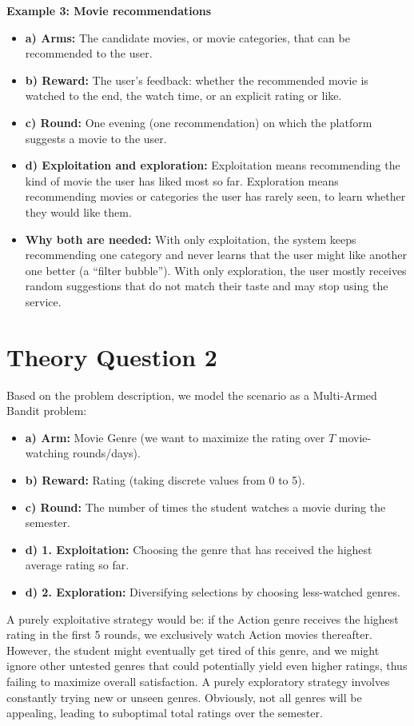 \documentclass[12pt,a4paper]{article}
\begin{document}
\textbf{Example 3: Movie recommendations}
\begin{itemize}
    \item \textbf{a) Arms:} The candidate movies, or movie categories, that can be recommended to the user.
%
    \item \textbf{b) Reward:} The user's feedback: whether the recommended movie is watched to the end, the watch time, or an explicit rating or like.
%
    \item \textbf{c) Round:} One evening (one recommendation) on which the platform suggests a movie to the user.
%
    \item \textbf{d) Exploitation and exploration:} Exploitation means recommending the kind of movie the user has liked most so far.
Exploration means recommending movies or categories the user has rarely seen, to learn whether they would like them.
%
    \item \textbf{Why both are needed:} With only exploitation, the system keeps recommending one category and never learns that the user might like another one better (a ``filter bubble'').
With only exploration, the user mostly receives random suggestions that do not match their taste and may stop using the service.
%
\end{itemize}

\section*{Theory Question 2} %
Based on the problem description, we model the scenario as a Multi-Armed Bandit problem: %
\begin{itemize}
    \item \textbf{a) Arm:} Movie Genre (we want to maximize the rating over $T$ movie-watching rounds/days).
%
    \item \textbf{b) Reward:} Rating (taking discrete values from 0 to 5).
%
    \item \textbf{c) Round:} The number of times the student watches a movie during the semester.
%
    \item \textbf{d) 1. Exploitation:} Choosing the genre that has received the highest average rating so far.
%
    \item \textbf{d) 2. Exploration:} Diversifying selections by choosing less-watched genres.
%
\end{itemize}

A purely exploitative strategy would be: if the Action genre receives the highest rating in the first 5 rounds, we exclusively watch Action movies thereafter.
However, the student might eventually get tired of this genre, and we might ignore other untested genres that could potentially yield even higher ratings, thus failing to maximize overall satisfaction.
%
A purely exploratory strategy involves constantly trying new or unseen genres.
Obviously, not all genres will be appealing, leading to suboptimal total ratings over the semester.
%
\end{document}
